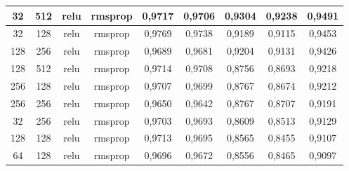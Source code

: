 \begin{table}[H]
{\begin{tabular}{|c|c|c|c|c|c|c|c|c|}
				32             & 512                     & relu                & rmsprop            & 0,9717                             & 0,9706                                & 0,9304                    & 0,9238                       & 0,9491                \\ \hline
				32             & 128                     & relu                & rmsprop            & 0,9769                             & 0,9738                                & 0,9189                    & 0,9115                       & 0,9453                \\ \hline
				128            & 256                     & relu                & rmsprop            & 0,9689                             & 0,9681                                & 0,9204                    & 0,9131                       & 0,9426                \\ \hline
				128            & 512                     & relu                & rmsprop            & 0,9714                             & 0,9708                                & 0,8756                    & 0,8693                       & 0,9218                \\ \hline
				256            & 128                     & relu                & rmsprop            & 0,9707                             & 0,9699                                & 0,8767                    & 0,8674                       & 0,9212                \\ \hline
				256            & 256                     & relu                & rmsprop            & 0,9650                             & 0,9642                                & 0,8767                    & 0,8707                       & 0,9191                \\ \hline
				32             & 256                     & relu                & rmsprop            & 0,9703                             & 0,9693                                & 0,8609                    & 0,8513                       & 0,9129                \\ \hline
				128            & 128                     & relu                & rmsprop            & 0,9713                             & 0,9695                                & 0,8565                    & 0,8455                       & 0,9107                \\ \hline
				64             & 128                     & relu                & rmsprop            & 0,9696                             & 0,9672                                & 0,8556                    & 0,8465                       & 0,9097                \\ \hline

\end{tabular}}
\end{table}
